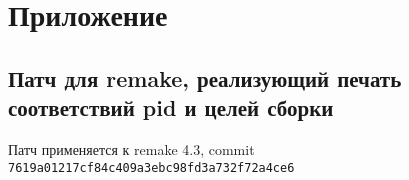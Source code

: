 \section*{Приложение}
\label{sec:Apendix} 

\subsection{Патч для remake, реализующий печать соответствий pid и целей сборки}
\label{subsec:remake-patch}

Патч применяется к remake 4.3, commit \texttt{7619a01217cf84c409a3ebc98fd3a732f72a4ce6}


